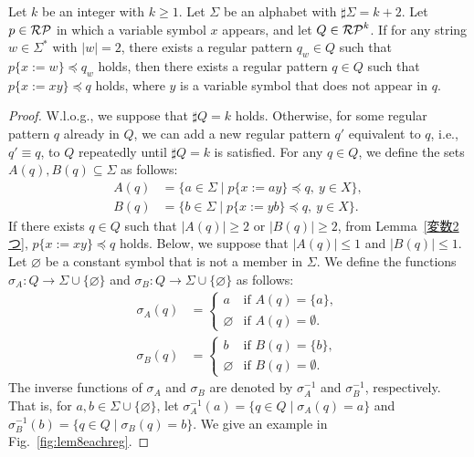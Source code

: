 \begin{lem}\label{追加補題1}
Let $k$ be an integer with $k\geq 1$.
Let $\Sigma$ be an alphabet with $\sharp \Sigma = k + 2$.
Let $p \in \mathcal{RP}$ in which a variable symbol $x$ appears, and let $Q \in \mathcal{RP}^{k}$.
If for any string $w \in \Sigma^{\ast}$ with $|w|=2$, there exists a regular pattern $q_{w} \in Q$ such that $p \{ x:=w \} \preceq q_{w}$ holds, then there exists a regular pattern $q \in Q$ such that $p \{ x:=xy \} \preceq q$ holds, where $y$ is a variable symbol that does not appear in $q$.
\end{lem}

\begin{proof}
W.l.o.g., we suppose that $\sharp Q = k$ holds. Otherwise, for some regular pattern $q$ already in $Q$, we can add a new regular pattern $q'$ equivalent to $q$, i.e., $q' \equiv q$, to $Q$ repeatedly until $\sharp Q = k$ is satisfied.
For any $q \in Q$, we define the sets $A(q), B(q) \subseteq \Sigma$ as follows:
\begin{align*}
  A(q) & = \{ a \in \Sigma \mid p \{ x:=ay \} \preceq q,\ y\in X\},\\ 
  B(q) & = \{ b \in \Sigma \mid p \{ x:=yb \} \preceq q,\ y\in X\}.
  \end{align*}
If there exists $q\in Q$ such that $|A(q)|\geq 2$ or $|B(q)|\geq 2$, from Lemma~\ref{変数2つ}, $p\{x := xy\} \preceq q$ holds.
Below, we suppose that $|A(q)|\leq 1$ and $|B(q)|\leq 1$.
Let $\varnothing$ be a constant symbol that is not a member in $\Sigma$.
We define the functions $\sigma_{A}: Q \rightarrow \Sigma \cup \{\varnothing\}$ and $\sigma_{B}: Q \rightarrow \Sigma \cup \{\varnothing\}$ as follows:
\begin{align*}
  \sigma_{A}(q) & =
  \begin{cases}
    a & \textrm{if } A(q) = \{a\}, \\
    \varnothing & \textrm{if } A(q) = \emptyset.
  \end{cases}\\
  \sigma_{B}(q) & =
  \begin{cases}
    b & \textrm{if } B(q) = \{b\}, \\
    \varnothing & \textrm{if } B(q) = \emptyset.
  \end{cases}
\end{align*}
The inverse functions of $\sigma_{A}$ and $\sigma_{B}$ are denoted by $\sigma_{A}^{-1}$ and $\sigma_{B}^{-1}$, respectively. That is, for $a,b \in \Sigma \cup \{\varnothing\}$, let $\sigma_{A}^{-1}(a) = \{q \in Q \mid \sigma_{A}(q) = a\}$ and $\sigma_{B}^{-1}(b) = \{q \in Q \mid \sigma_{B}(q) = b\}$. 
We give an example in Fig.~\ref{fig:lem8eachreg}.


\end{proof}
